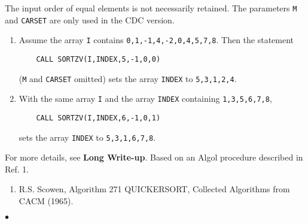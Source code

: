\Restrict
The input order of equal elements is not necessarily
retained. The parameters {\tt M} and {\tt CARSET} are only used in the
CDC version.
\newpage
\Examples
\begin{enumerate}
\item Assume the array {\tt I} contains {\tt 0,1,-1,4,-2,0,4,5,7,8}.
Then the statement
\begin{verbatim}
    CALL SORTZV(I,INDEX,5,-1,0,0)
\end{verbatim}
({\tt M} and {\tt CARSET} omitted) sets the array {\tt INDEX} to
{\tt 5,3,1,2,4}.
\item  With the same array {\tt I} and the array {\tt INDEX} containing
{\tt 1,3,5,6,7,8},
\begin{verbatim}
    CALL SORTZV(I,INDEX,6,-1,0,1)
\end{verbatim}
sets the array {\tt INDEX} to {\tt 5,3,1,6,7,8}.
\end{enumerate}
For more details, see {\bf Long Write-up}.
\Source
Based on an Algol procedure described in Ref. 1.
\Refer
\begin{enumerate}
\item R.S. Scowen, Algorithm 271 QUICKERSORT, Collected Algorithms
from CACM (1965).
\end{enumerate}
$\bullet$
